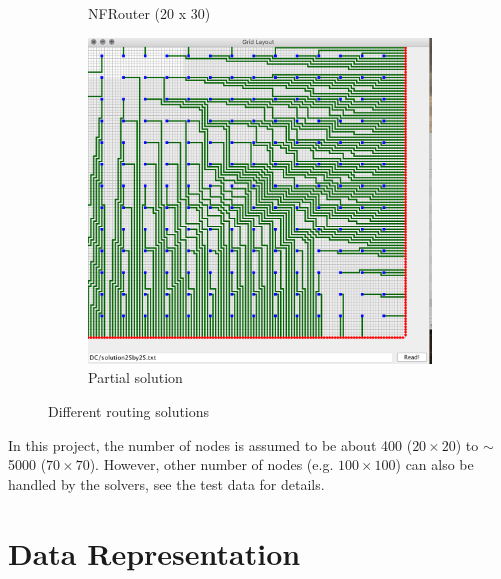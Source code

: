 \documentclass{article}
\begin{document}
\begin{spacing}{1.1}
\begin{figure}[H]
\begin{subfigure}{0.3\textwidth}
            \caption{NFRouter (20 x 30)}
        \end{subfigure}
        \begin{subfigure}{0.3\textwidth}
            \includegraphics[width = \textwidth]{ove3.png}
            \caption{Partial solution}
        \end{subfigure}
        \caption{Different routing solutions}
    \end{figure}
    In this project, the number of nodes is assumed to be about 400 ($20 \times 20$) to $\sim$5000 ($70 \times 70$). However, other number of nodes (e.g. $100 \times 100$) can also be handled by the solvers, see the test data
    for details.
    \section{Data Representation}

\end{spacing}
\end{document}
